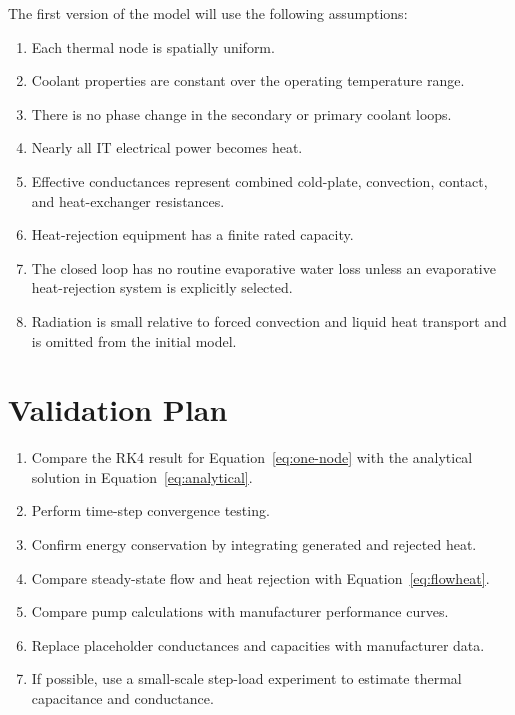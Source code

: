 \documentclass[11pt]{article}
\begin{document}
The first version of the model will use the following assumptions:

\begin{enumerate}[leftmargin=2em]
    \item Each thermal node is spatially uniform.
    \item Coolant properties are constant over the operating temperature range.
    \item There is no phase change in the secondary or primary coolant loops.
    \item Nearly all IT electrical power becomes heat.
    \item Effective conductances represent combined cold-plate, convection, contact,
          and heat-exchanger resistances.
    \item Heat-rejection equipment has a finite rated capacity.
    \item The closed loop has no routine evaporative water loss unless an evaporative
          heat-rejection system is explicitly selected.
    \item Radiation is small relative to forced convection and liquid heat transport
          and is omitted from the initial model.
\end{enumerate}

\section{Validation Plan}

\begin{enumerate}[leftmargin=2em]
    \item Compare the RK4 result for Equation~\eqref{eq:one-node} with the analytical
          solution in Equation~\eqref{eq:analytical}.
    \item Perform time-step convergence testing.
    \item Confirm energy conservation by integrating generated and rejected heat.
    \item Compare steady-state flow and heat rejection with
          Equation~\eqref{eq:flowheat}.
    \item Compare pump calculations with manufacturer performance curves.
    \item Replace placeholder conductances and capacities with manufacturer data.
    \item If possible, use a small-scale step-load experiment to estimate thermal
          capacitance and conductance.
\end{enumerate}
\end{document}

